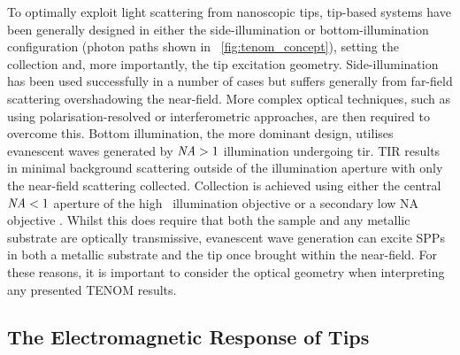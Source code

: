 \documentclass{article}
\begin{document}
To optimally exploit light scattering from nanoscopic tips, tip-based systems have been generally designed in either the side-illumination or bottom-illumination configuration (photon paths shown in \figurename~\ref{fig:tenom_concept}), setting the collection and, more importantly, the tip excitation geometry. Side-illumination has been used successfully in a number of cases \cite{mehtani2006, steidtner2007, zhang2013, wickramasinghe2014} but suffers generally from far-field scattering overshadowing the near-field. More complex optical techniques, such as using polarisation-resolved or interferometric approaches, are then required to overcome this. %
Bottom illumination, the more dominant design, utilises evanescent waves generated by $\mathit{NA}>1$ illumination undergoing \gls{tir}. TIR results in minimal background scattering outside of the illumination aperture with only the near-field scattering collected. Collection is achieved using either the central $\mathit{NA}<1$ aperture of the high \NA\ illumination objective \cite{hayazawa2001, yeo2006, yeo2007, zhang2013experimental, mino2014, kumar2014} or a secondary low NA objective \cite{hayazawa2007, taguchi2009, uetsuki2012}. Whilst this does require that both the sample and any metallic substrate are optically transmissive, evanescent wave generation can excite SPPs in both a metallic substrate and the tip once brought within the near-field. For these reasons, it is important to consider the optical geometry when interpreting any presented TENOM results.

\subsection{The Electromagnetic Response of Tips}
\end{document}
